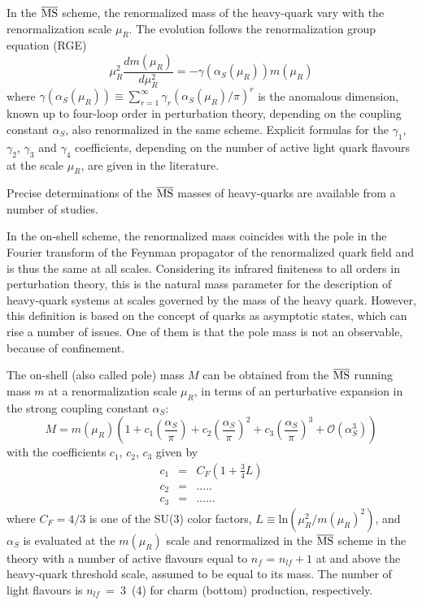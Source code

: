 \documentclass[12pt,a4paper]{article}
\begin{document}
In the $\overline{\rm MS}$ scheme, the renormalized mass of the heavy-quark vary with the renormalization scale $\mu_R$. The evolution follows the renormalization group equation (RGE)
\begin{equation}
\mu_R^2 \frac{d m(\mu_R)}{d \mu_R^2} = - \gamma(\alpha_S(\mu_R)) m(\mu_R)
\end{equation}
where $\gamma (\alpha_S(\mu_R)) \equiv \sum_{r=1}^\infty \gamma_r (\alpha_S(\mu_R)/\pi)^r$ is the anomalous dimension, known up to four-loop order in perturbation theory, depending on the coupling constant $\alpha_S$, also renormalized in the same scheme. Explicit formulas for the $\gamma_1$, $\gamma_2$, $\gamma_3$ and $\gamma_4$ coefficients, depending on the number of active light quark flavours at the scale $\mu_R$, 
are given in the literature.
  
Precise determinations of the $\overline{\rm MS}$ masses of heavy-quarks are available from a number of studies.

In the on-shell scheme, the renormalized mass coincides with the pole in the Fourier transform of the Feynman propagator of the renormalized quark field and is thus the same at all scales. Considering its infrared finiteness to all orders in perturbation theory, this is the natural mass parameter for the description of heavy-quark systems at scales governed by the mass of the heavy quark. However, this definition is based on the concept of quarks as asymptotic states, which can rise a number of issues. 
One of them is that 
the pole mass is not an observable, because of confinement. 

The on-shell (also called pole) mass $M$ can be obtained from the $\overline{\rm MS}$ running mass $m$ at a renormalization scale $\mu_R$, in terms of an 
perturbative 
expansion in the strong coupling constant $\alpha_S$:
\begin{equation}
M = m(\mu_R)\left(1 + c_1 \left(\frac{\alpha_S}{\pi}\right) + c_2 \left(\frac{\alpha_S}{\pi}\right)^2 + c_3 \left(\frac{\alpha_S}{\pi}\right)^3 + \mathcal{O}(\alpha_S^3)\right)
\label{eq1}
\end{equation}
with  the      coefficients $c_1$, $c_2$, $c_3$ given by
\begin{eqnarray}
c_1 & = & C_F \left(1+\frac{3}{4} L\right)\\
c_2 & = & .....\\
c_3 & = & ......
\end{eqnarray}
where $C_F=4/3$ is one of the SU(3) color factors, $L \equiv \mathrm{ln}(\mu_R^2/m(\mu_R)^2)$, and $\alpha_S$ is evaluated at the $m(\mu_R)$ scale and renormalized in the $\overline{\rm MS}$ scheme in the theory with a number of active flavours equal to $n_{f}$ = $n_{lf} + 1$ at and above the heavy-quark threshold scale, assumed to be equal to its mass. The number of light flavours is $n_{lf}$~=~3~(4) for charm (bottom) production, respectively. 
\end{document}

